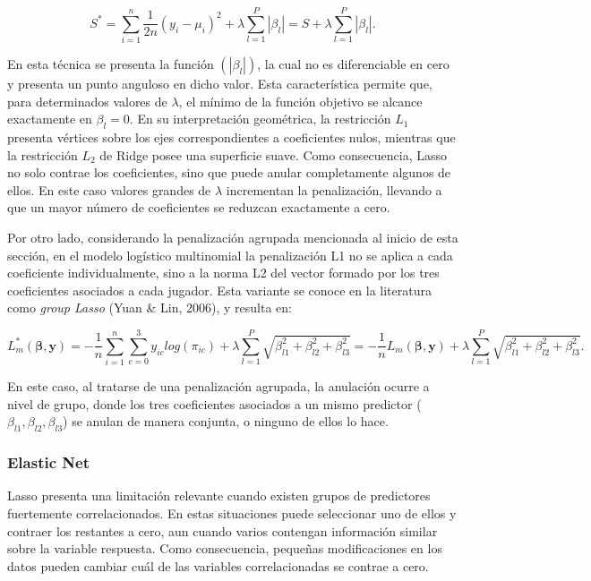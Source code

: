 \documentclass[
  12pt,
]{article}
\begin{document}
\begin{equation}
S^*= \sum_{i=1}^n \frac{1}{2n} (y_i-\mu_i)^2 + \lambda \sum_{l=1}^P |\beta_l|=S+\lambda \sum_{l=1}^P |\beta_l|.
\end{equation}

En esta técnica se presenta la función \((|\beta_l|)\), la cual no es
diferenciable en cero y presenta un punto anguloso en dicho valor. Esta
característica permite que, para determinados valores de \(\lambda\), el
mínimo de la función objetivo se alcance exactamente en \(\beta_l=0\).
En su interpretación geométrica, la restricción \(L_1\) presenta
vértices sobre los ejes correspondientes a coeficientes nulos, mientras
que la restricción \(L_2\) de Ridge posee una superficie suave. Como
consecuencia, Lasso no solo contrae los coeficientes, sino que puede
anular completamente algunos de ellos. En este caso valores grandes de
\(\lambda\) incrementan la penalización, llevando a que un mayor número
de coeficientes se reduzcan exactamente a cero.

Por otro lado, considerando la penalización agrupada mencionada al
inicio de esta sección, en el modelo logístico multinomial la
penalización L1 no se aplica a cada coeficiente individualmente, sino a
la norma L2 del vector formado por los tres coeficientes asociados a
cada jugador. Esta variante se conoce en la literatura como \emph{group
Lasso} (Yuan \& Lin, 2006), y resulta en:

\begin{equation}
L^*_m(\boldsymbol{\beta},\boldsymbol{y})= - \frac{1}{n}\sum_{i=1}^n \sum_{c=0}^3 y_{ic} log(\pi_{ic}) + \lambda \sum_{l=1}^P \sqrt{\beta_{l1}^2+\beta_{l2}^2+\beta_{l3}^2}= - \frac{1}{n}L_m(\boldsymbol{\beta},\boldsymbol{y}) + \lambda \sum_{l=1}^P \sqrt{\beta_{l1}^2+\beta_{l2}^2+\beta_{l3}^2}.
\end{equation}

En este caso, al tratarse de una penalización agrupada, la anulación
ocurre a nivel de grupo, donde los tres coeficientes asociados a un
mismo predictor (\(\beta_{l1},\beta_{l2},\beta_{l3}\)) se anulan de
manera conjunta, o ninguno de ellos lo hace.

\subsubsection{Elastic Net}\label{elastic-net}

Lasso presenta una limitación relevante cuando existen grupos de
predictores fuertemente correlacionados. En estas situaciones puede
seleccionar uno de ellos y contraer los restantes a cero, aun cuando
varios contengan información similar sobre la variable respuesta. Como
consecuencia, pequeñas modificaciones en los datos pueden cambiar cuál
de las variables correlacionadas se contrae a cero.
\end{document}
